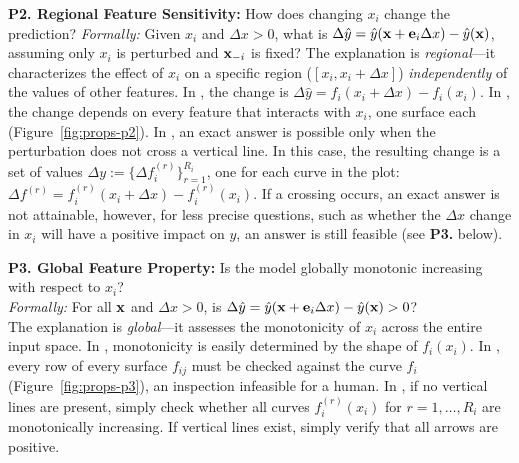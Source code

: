 \textbf{P2. Regional Feature Sensitivity:} How does changing $x_i$ change the prediction? 
\textit{Formally:} Given $x_i$ and $\Delta x>0$, what is $\Delta \hat{y} = \hat y(\mathbf{x} +  \mathbf{e}_i \Delta x )-\hat y(\mathbf{x})$, assuming only $x_i$ is perturbed and $\mathbf{x}_{-i}$ is fixed? 
The explanation is \emph{regional}—it characterizes the effect of $x_i$ on a specific region ($[x_i, x_i + \Delta x]$) \emph{independently} of the values of other features.
In \gam, the change is $\Delta \hat{y} = f_i(x_i+\Delta x)-f_i(x_i)$.
In \gamm, the change depends on every feature that interacts with $x_i$, one surface each (Figure~\ref{fig:props-p2}).
In \method, an exact answer is possible only when the perturbation does not cross a vertical line. 
In this case, the resulting change is a set of values $\Delta y := \{ \Delta f_i^{(r)}\}_{r=1}^{R_i}$, one for each curve in the plot: $\Delta f^{(r)} = f_i^{(r)}(x_i+\Delta x)-f_i^{(r)}(x_i)$. 
If a crossing occurs, an exact answer is not attainable, however, for less precise questions, such as whether the $\Delta x$ change in $x_i$ will have a positive impact on $y$, an answer is still feasible (see \textbf{P3.} below).

\textbf{P3. Global Feature Property:} Is the model globally monotonic increasing with respect to $x_i$?\\ 
\textit{Formally:} For all $\mathbf{x}$ and $\Delta x>0$, is $\Delta \hat{y} = \hat y(\mathbf{x} + \mathbf{e}_i \Delta x )-\hat y(\mathbf{x}) > 0$?\\
The explanation is \textit{global}—it assesses the monotonicity of $x_i$ across the entire input space.
In \gam, monotonicity is easily determined by the shape of $f_i(x_i)$.
In \gamm, every row of every surface $f_{ij}$ must be checked against the curve $f_i$ (Figure~\ref{fig:props-p3}), an inspection infeasible for a human.
In \method, if no vertical lines are present, simply check whether all curves $f_i^{(r)}(x_i)$ for $r=1, \ldots, R_i$ are monotonically increasing. If vertical lines exist, simply verify that all arrows are positive.
